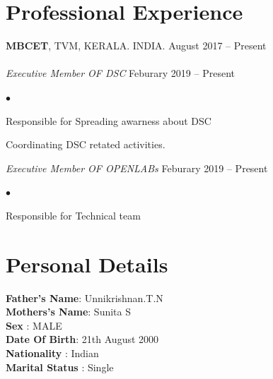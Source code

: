 \documentclass[margin,line]{res}
\newenvironment{list2}{
  \begin{list}{$\bullet$}{%
      \setlength{\itemsep}{0in}
      \setlength{\parsep}{0in} \setlength{\parskip}{0in}
      \setlength{\topsep}{0in} \setlength{\partopsep}{0in}
      \setlength{\leftmargin}{0.2in}}}{\end{list}}
\begin{document}
\begin{resume}
\begin{enumerate}
\end{enumerate}
\section{\sc Professional Experience}
{\bf MBCET}, TVM, KERALA. INDIA. \hfill{August 2017 -- Present}\\
\\

{\em Executive Member  OF DSC }\hfill {Feburary 2019 -- Present}\\
\begin{list2} %
	\item Responsible for Spreading awarness about DSC  \\
	\item Coordinating DSC retated activities.
\end{list2}
{\em Executive Member  OF OPENLABs }\hfill {Feburary 2019 -- Present}\\
\begin{list2} %
	\item Responsible for Technical team  \\
	
\end{list2}
\section{\sc Personal Details}
{\bf Father's Name}: Unnikrishnan.T.N \\
{\bf Mothers's Name}:  Sunita S\\
{\bf Sex}  :  MALE\\
{\bf Date Of Birth}:  21th August 2000\\
{\bf Nationality}       : Indian \\
{\bf Marital Status}       : Single \\



\end{resume}
\end{document}
